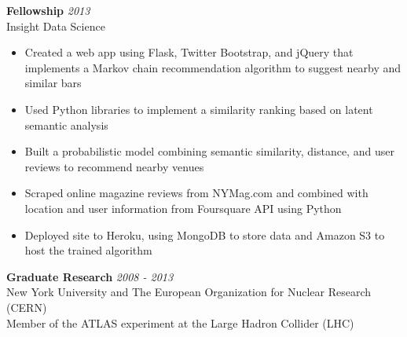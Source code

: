 \documentclass[9pt]{article}
\newenvironment{changemargin}[2]{%
  \begin{list}{}{%
    \setlength{\topsep}{0pt}%
    \setlength{\leftmargin}{#1}%
    \setlength{\rightmargin}{#2}%
    \setlength{\listparindent}{\parindent}%
    \setlength{\itemindent}{\parindent}%
    \setlength{\parsep}{\parskip}%
  }%
  \item[]}{\end{list}
}
\newenvironment{body} {
	\vspace*{-16pt}
	\begin{changemargin}{-0.25in}{-0.5in}
  }	
	{\end{changemargin}
}
\begin{document}
\begin{body}
	\vspace{14pt}
	\textbf{Fellowship} \hfill \emph{2013}\\
        Insight Data Science
        \begin{itemize}
        \item Created a web app using Flask, Twitter Bootstrap, and jQuery that implements a Markov chain recommendation algorithm to suggest nearby and similar bars \\
        \item Used Python libraries to implement a similarity ranking based on latent semantic analysis \\
        \item Built a probabilistic model combining semantic similarity, distance, and user reviews to recommend nearby venues \\
        \item Scraped online magazine reviews from NYMag.com and combined with location and user information from Foursquare API using Python \\
        \item Deployed site to Heroku, using MongoDB to store data and Amazon S3 to host the trained algorithm \\

        \end{itemize}

        \medskip

	\textbf{Graduate Research} \hfill \emph{2008 - 2013}\\
	New York University and The European Organization for Nuclear Research (CERN) \\
        Member of the ATLAS experiment at the Large Hadron Collider (LHC) \\

        \medskip


\end{body}
\end{document}
